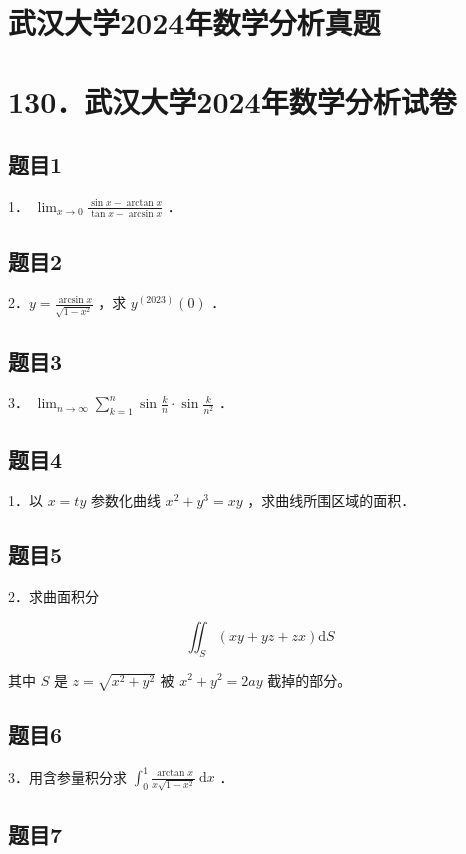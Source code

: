 \documentclass{article}
\begin{document}
\section*{武汉大学2024年数学分析真题}
\section*{130．武汉大学2024年数学分析试卷}

\subsection{题目1}
1． \(\lim _{x \rightarrow 0} \frac{\sin x-\arctan x}{\tan x-\arcsin x}\) ．

\subsection{题目2}
2．\(y=\frac{\arcsin x}{\sqrt{1-x^{2}}}\) ，求 \(y^{(2023)}(0)\) ．

\subsection{题目3}
3． \(\lim _{n \rightarrow \infty} \sum_{k=1}^{n} \sin \frac{k}{n} \cdot \sin \frac{k}{n^{2}}\) ．

\subsection{题目4}
1．以 \(x=t y\) 参数化曲线 \(x^{2}+y^{3}=x y\) ，求曲线所围区域的面积．

\subsection{题目5}
2．求曲面积分

\[
\iint_{S}(x y+y z+z x) \mathrm{d} S
\]

其中 \(S\) 是 \(z=\sqrt{x^{2}+y^{2}}\) 被 \(x^{2}+y^{2}=2 a y\) 截掉的部分。

\subsection{题目6}
3．用含参量积分求 \(\int_{0}^{1} \frac{\arctan x}{x \sqrt{1-x^{2}}} \mathrm{~d} x\) ．

\begin{itemize}

\subsection{题目7}
\end{itemize}
\end{document}

